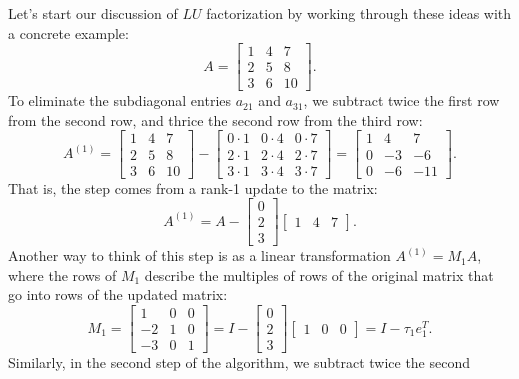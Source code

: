 \documentclass[12pt, leqno]{article}
\begin{document}
Let's start our discussion of $LU$ factorization by working through
these ideas with a concrete example:
\[
  A =
  \begin{bmatrix}
    1 & 4 & 7 \\
    2 & 5 & 8 \\
    3 & 6 & 10
  \end{bmatrix}.
\]
To eliminate the subdiagonal entries $a_{21}$ and $a_{31}$, we
subtract twice the first row from the second row, and thrice the
second row from the third row:
\[
  A^{(1)} =
  \begin{bmatrix}
    1 & 4 & 7 \\
    2 & 5 & 8 \\
    3 & 6 & 10
  \end{bmatrix} -
  \begin{bmatrix}
    0 \cdot 1 & 0 \cdot 4 & 0 \cdot 7 \\
    2 \cdot 1 & 2 \cdot 4 & 2 \cdot 7 \\
    3 \cdot 1 & 3 \cdot 4 & 3 \cdot 7
  \end{bmatrix}
  =
  \begin{bmatrix}
    1 &  4 &  7 \\
    0 & -3 & -6 \\
    0 & -6 & -11
  \end{bmatrix}.
\]
That is, the step comes from a rank-1 update to the matrix:
\[
  A^{(1)} =
  A -
  \begin{bmatrix} 0 \\ 2 \\ 3 \end{bmatrix}
  \begin{bmatrix} 1 & 4 & 7 \end{bmatrix}.
\]
Another way to think of this step is as a linear transformation
$A^{(1)} = M_1 A$, where the rows of $M_1$ describe the multiples
of rows of the original matrix that go into rows of the updated matrix:
\[
  M_1 = \begin{bmatrix} 1 & 0 & 0 \\ -2 & 1 & 0 \\ -3 & 0 & 1 \end{bmatrix}
      = I - \begin{bmatrix} 0 \\ 2 \\ 3 \end{bmatrix}
            \begin{bmatrix} 1 & 0 & 0 \end{bmatrix}
      = I - \tau_1 e_1^T.
\]
Similarly, in the second step of the algorithm, we subtract twice the second
\end{document}
